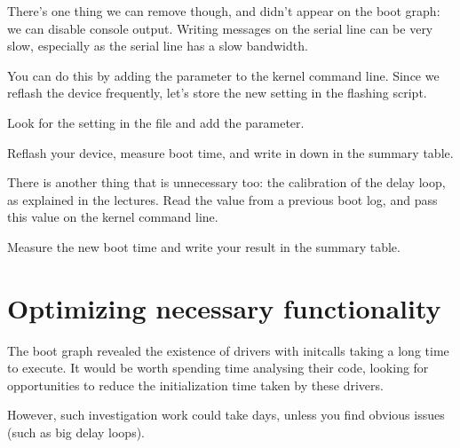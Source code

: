 There's one thing we can remove though, and didn't appear on the boot
graph: we can disable console output. Writing messages on the serial
line can be very slow, especially as the serial line has a slow
bandwidth.

You can do this by adding the  parameter to the kernel
command line. Since we reflash the device frequently, let's store
the new setting in the flashing script.

Look for the  setting in the
 file and add the 
parameter.

Reflash your device, measure boot time, and write in down in the summary
table.

There is another thing that is unnecessary too: the calibration of the
delay loop, as explained in the lectures. Read the  value from
a previous boot log, and pass this value on the kernel command line.

Measure the new boot time and write your result in the summary table.

\section{Optimizing necessary functionality}

The boot graph revealed the existence of drivers with initcalls taking a
long time to execute. It would
be worth spending time analysing their code, looking for opportunities to
reduce the initialization time taken by these drivers.

However, such investigation work could take days, unless you find
obvious issues (such as big delay loops).

